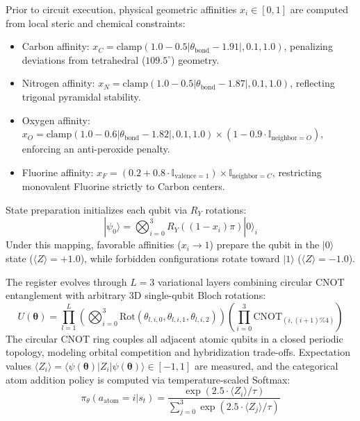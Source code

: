 \documentclass[10pt,a4paper]{article}
\begin{document}
Prior to circuit execution, physical geometric affinities $x_i \in [0, 1]$ are computed from local steric and chemical constraints:
\begin{itemize}[noitemsep]
    \item Carbon affinity: $x_C = \text{clamp}(1.0 - 0.5|\theta_{\text{bond}} - 1.91|, 0.1, 1.0)$, penalizing deviations from tetrahedral ($109.5^\circ$) geometry.
    \item Nitrogen affinity: $x_N = \text{clamp}(1.0 - 0.5|\theta_{\text{bond}} - 1.87|, 0.1, 1.0)$, reflecting trigonal pyramidal stability.
    \item Oxygen affinity: $x_O = \text{clamp}(1.0 - 0.6|\theta_{\text{bond}} - 1.82|, 0.1, 1.0) \times (1 - 0.9 \cdot \mathbb{I}_{\text{neighbor}=O})$, enforcing an anti-peroxide penalty.
    \item Fluorine affinity: $x_F = (0.2 + 0.8 \cdot \mathbb{I}_{\text{valence}=1}) \times \mathbb{I}_{\text{neighbor}=C}$, restricting monovalent Fluorine strictly to Carbon centers.
\end{itemize}

State preparation initializes each qubit via $R_Y$ rotations:
\begin{equation}
|\psi_0\rangle = \bigotimes_{i=0}^3 R_Y((1 - x_i)\pi) |0\rangle_i
\end{equation}
Under this mapping, favorable affinities ($x_i \to 1$) prepare the qubit in the $|0\rangle$ state ($\langle Z \rangle = +1.0$), while forbidden configurations rotate toward $|1\rangle$ ($\langle Z \rangle = -1.0$).

The register evolves through $L=3$ variational layers combining circular CNOT entanglement with arbitrary 3D single-qubit Bloch rotations:
\begin{equation}
U(\boldsymbol{\theta}) = \prod_{l=1}^L \left( \bigotimes_{i=0}^3 \text{Rot}(\theta_{l,i,0}, \theta_{l,i,1}, \theta_{l,i,2}) \right) \left( \prod_{i=0}^3 \text{CNOT}_{(i, (i+1)\%4)} \right)
\end{equation}
The circular CNOT ring couples all adjacent atomic qubits in a closed periodic topology, modeling orbital competition and hybridization trade-offs. Expectation values $\langle Z_i \rangle = \langle \psi(\boldsymbol{\theta}) | Z_i | \psi(\boldsymbol{\theta}) \rangle \in [-1, 1]$ are measured, and the categorical atom addition policy is computed via temperature-scaled Softmax:
\begin{equation}
\pi_\theta(a_{\text{atom}} = i | s_t) = \frac{\exp(2.5 \cdot \langle Z_i \rangle / \tau)}{\sum_{j=0}^3 \exp(2.5 \cdot \langle Z_j \rangle / \tau)}
\end{equation}
\end{document}
